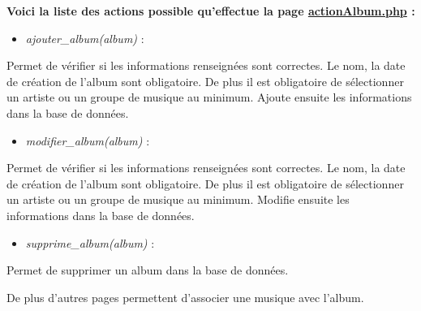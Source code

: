 			\begin{paragraphe}
                \textbf{Voici la liste des actions possible qu'effectue la page \underline{actionAlbum.php} :}
            
                \begin{itemize}
                    \item \emph{ajouter\_album(album)} :
                \end{itemize}
                \begin{paragraphe}
                    Permet de vérifier si les informations renseignées sont correctes. Le nom, la date de création de l'album sont obligatoire. De plus il est obligatoire de sélectionner un artiste ou un groupe de musique au minimum. Ajoute ensuite les informations dans la base de données.
                \end{paragraphe}
                
                \begin{itemize}
                    \item \emph{modifier\_album(album)} :
                \end{itemize}
                \begin{paragraphe}
                    Permet de vérifier si les informations renseignées sont correctes. Le nom, la date de création de l'album sont obligatoire. De plus il est obligatoire de sélectionner un artiste ou un groupe de musique au minimum. Modifie ensuite les informations dans la base de données.
                \end{paragraphe}
                
                \begin{itemize}
                    \item \emph{supprime\_album(album)} :
                \end{itemize}
                \begin{paragraphe}
                    Permet de supprimer un album dans la base de données.
                \end{paragraphe}
            \end{paragraphe}
            
            \begin{paragraphe}
                De plus d'autres pages permettent d'associer une musique avec l'album.
            \end{paragraphe}

